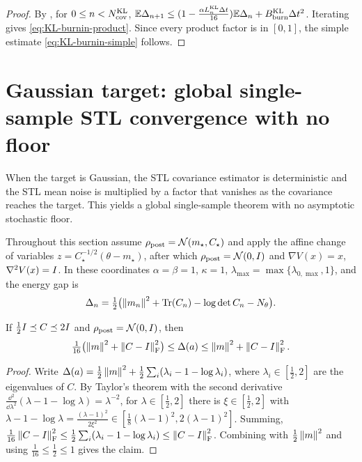 \begin{proof}
By , for $0\leq n<N_{\mathrm{cov}}^{\mathrm{KL}}$,
$\mathbb{E}\Delta_{n+1}\leq(1-\tfrac{\alpha L_n^{\mathrm{KL}}\Delta t}{16})\mathbb{E}\Delta_n+B_{\mathrm{burn}}^{\mathrm{KL}}\Delta t^2$.
Iterating gives \eqref{eq:KL-burnin-product}. Since every product factor is in $[0,1]$, the
simple estimate \eqref{eq:KL-burnin-simple} follows.
\end{proof}

\section{Gaussian target: global single-sample STL convergence with no floor}

When the target is Gaussian, the STL covariance estimator is deterministic and the STL
mean noise is multiplied by a factor that vanishes as the covariance reaches the target.
This yields a global single-sample theorem with no asymptotic stochastic floor.

Throughout this section assume $\rho_{\mathrm{post}}=\mathcal{N}(m_\star,C_\star)$ and apply the affine
change of variables $z=C_\star^{-1/2}(\theta-m_\star)$, after which $\rho_{\mathrm{post}}=\mathcal{N}(0,I)$
and $\nabla V(x)=x$, $\nabla^2V(x)=I$. In these coordinates $\alpha=\beta=1$, $\kappa=1$,
$\lambda_{\max}=\max\{\lambda_{0,\max},1\}$, and the energy gap is
\[
    \Delta_n
    =
    \tfrac12\bigl(\left\lVert m_n\right\rVert^2+\operatorname{Tr}(C_n)-\log\det C_n-N_\theta\bigr).
\]

\begin{lemma}
\label{lem:energy-equiv}
If $\tfrac12I\preceq C\preceq2I$ and $\rho_{\mathrm{post}}=\mathcal{N}(0,I)$, then
\[
    \tfrac1{16}\bigl(\left\lVert m\right\rVert^2+\left\lVert C-I\right\rVert_{\mathrm{F}}^2\bigr)
    \leq
    \Delta(a)
    \leq
    \left\lVert m\right\rVert^2+\left\lVert C-I\right\rVert_{\mathrm{F}}^2 .
\]
\end{lemma}

\begin{proof}
Write $\Delta(a)=\tfrac12\left\lVert m\right\rVert^2+\tfrac12\sum_i(\lambda_i-1-\log\lambda_i)$, where
$\lambda_i\in[\tfrac12,2]$ are the eigenvalues of $C$. By Taylor's theorem with the
second derivative $\tfrac{\dd^2}{\dd\lambda^2}(\lambda-1-\log\lambda)=\lambda^{-2}$, for
$\lambda\in[\tfrac12,2]$ there is $\xi\in[\tfrac12,2]$ with
$\lambda-1-\log\lambda=\tfrac{(\lambda-1)^2}{2\xi^2}\in[\tfrac18(\lambda-1)^2,2(\lambda-1)^2]$.
Summing, $\tfrac1{16}\left\lVert C-I\right\rVert_{\mathrm{F}}^2\leq\tfrac12\sum_i(\lambda_i-1-\log\lambda_i)\leq\left\lVert C-I\right\rVert_{\mathrm{F}}^2$.
Combining with $\tfrac12\left\lVert m\right\rVert^2$ and using $\tfrac1{16}\leq\tfrac12\leq1$ gives the claim.
\end{proof}

